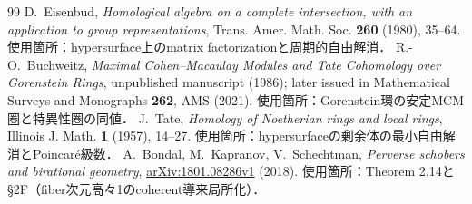 \documentclass[11pt,a4paper]{ltjsarticle}
\theoremstyle{definition}
\begin{document}
\begin{thebibliography}{99}
D.~Eisenbud, \emph{Homological algebra on a complete intersection, with an application to group representations},
Trans. Amer. Math. Soc. \textbf{260} (1980), 35--64.
使用箇所：hypersurface上のmatrix factorizationと周期的自由解消．
R.-O.~Buchweitz, \emph{Maximal Cohen--Macaulay Modules and Tate Cohomology over Gorenstein Rings},
unpublished manuscript (1986); later issued in Mathematical Surveys and Monographs \textbf{262}, AMS (2021).
使用箇所：Gorenstein環の安定MCM圏と特異性圏の同値．
J.~Tate, \emph{Homology of Noetherian rings and local rings},
Illinois J. Math. \textbf{1} (1957), 14--27.
使用箇所：hypersurfaceの剰余体の最小自由解消とPoincar\'e級数．
A.~Bondal, M.~Kapranov, V.~Schechtman, \emph{Perverse schobers and birational geometry},
\href{https://arxiv.org/abs/1801.08286}{arXiv:1801.08286v1} (2018).
使用箇所：Theorem 2.14と\S2F（fiber次元高々1のcoherent導来局所化）．
\end{thebibliography}
\end{document}
